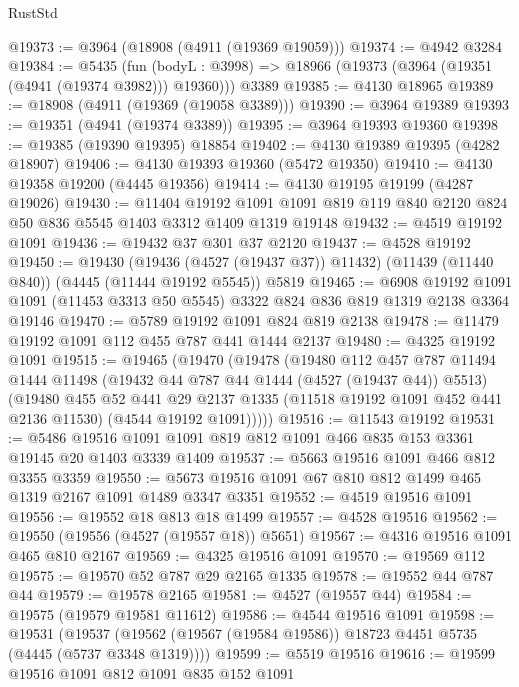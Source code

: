 \begin{lexlean}{RustStd}
\begin{coremodule}
{\begin{coremodule}
{{{{{{{{{{{{{{{{{{{{{{{{{{{{{{{{{{{{{{@19373 := @3964 (@18908 (@4911 (@19369 @19059)))
@19374 := @4942 @3284
@19384 := @5435
    (fun (bodyL : @3998) => @18966 (@19373 (@3964 (@19351 (@4941 (@19374 @3982))) @19360)))
    @3389
@19385 := @4130 @18965
@19389 := @18908 (@4911 (@19369 (@19058 @3389)))
@19390 := @3964 @19389
@19393 := @19351 (@4941 (@19374 @3389))
@19395 := @3964 @19393 @19360
@19398 := @19385 (@19390 @19395) @18854
@19402 := @4130 @19389 @19395 (@4282 @18907)
@19406 := @4130 @19393 @19360 (@5472 @19350)
@19410 := @4130 @19358 @19200 (@4445 @19356)
@19414 := @4130 @19195 @19199 (@4287 @19026)
@19430 := @11404
    @19192
    @1091
    @1091
    @819
    @119
    @840
    @2120
    @824
    @50
    @836
    @5545
    @1403
    @3312
    @1409
    @1319
    @19148
@19432 := @4519 @19192 @1091
@19436 := @19432 @37 @301 @37 @2120
@19437 := @4528 @19192
@19450 := @19430
    (@19436 (@4527 (@19437 @37)) @11432)
    (@11439 (@11440 @840))
    (@4445 (@11444 @19192 @5545))
    @5819
@19465 := @6908
    @19192
    @1091
    @1091
    (@11453 @3313 @50 @5545)
    @3322
    @824
    @836
    @819
    @1319
    @2138
    @3364
    @19146
@19470 := @5789 @19192 @1091 @824 @819 @2138
@19478 := @11479 @19192 @1091 @112 @455 @787 @441 @1444 @2137
@19480 := @4325 @19192 @1091
@19515 := @19465
    (@19470
      (@19478
        (@19480
          @112
          @457
          @787
          @11494
          @1444
          @11498
          (@19432 @44 @787 @44 @1444 (@4527 (@19437 @44)) @5513)
          (@19480
            @455
            @52
            @441
            @29
            @2137
            @1335
            (@11518 @19192 @1091 @452 @441 @2136 @11530)
            (@4544 @19192 @1091)))))
@19516 := @11543 @19192
@19531 := @5486 @19516 @1091 @1091 @819 @812 @1091 @466 @835 @153 @3361 @19145 @20 @1403 @3339 @1409
@19537 := @5663 @19516 @1091 @466 @812 @3355 @3359
@19550 := @5673 @19516 @1091 @67 @810 @812 @1499 @465 @1319 @2167 @1091 @1489 @3347 @3351
@19552 := @4519 @19516 @1091
@19556 := @19552 @18 @813 @18 @1499
@19557 := @4528 @19516
@19562 := @19550 (@19556 (@4527 (@19557 @18)) @5651)
@19567 := @4316 @19516 @1091 @465 @810 @2167
@19569 := @4325 @19516 @1091
@19570 := @19569 @112
@19575 := @19570 @52 @787 @29 @2165 @1335
@19578 := @19552 @44 @787 @44
@19579 := @19578 @2165
@19581 := @4527 (@19557 @44)
@19584 := @19575 (@19579 @19581 @11612)
@19586 := @4544 @19516 @1091
@19598 := @19531
    (@19537 (@19562 (@19567 (@19584 @19586)) @18723 @4451 @5735 (@4445 (@5737 @3348 @1319))))
@19599 := @5519 @19516
@19616 := @19599
    @19516
    @1091
    @812
    @1091
    @835
    @152
    @1091
}}}}}}}}}}}}}}}}}}}}}}}}}}}}}}}}}}}}}}
\end{coremodule}}
\end{coremodule}
\end{lexlean}
